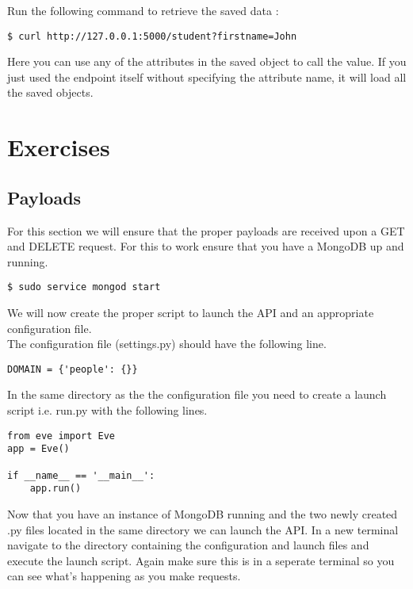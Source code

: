 \documentclass{article}
\begin{document}
Run the following command to retrieve the saved data :

\begin{verbatim}
$ curl http://127.0.0.1:5000/student?firstname=John
\end{verbatim}



\newline

Here you can use any of the attributes in the saved object to call the
value. If you just used the endpoint itself without specifying the
attribute name, it will load all the saved objects.

\section{Exercises}
\subsection{Payloads}
For this section we will ensure that the proper payloads are received
upon a GET and DELETE request. For this to work ensure that you have a
MongoDB up and running.
\begin{verbatim}
$ sudo service mongod start
\end{verbatim}

We will now create the proper script to launch the API and an
appropriate configuration file. \\ The configuration file
(settings.py) should have the following line.
\begin{verbatim}
DOMAIN = {'people': {}}
\end{verbatim}

In the same directory as the the configuration file you need to create
a launch script i.e. run.py with the following lines.

\begin{verbatim}
from eve import Eve
app = Eve()

if __name__ == '__main__':
    app.run()
\end{verbatim}

Now that you have an instance of MongoDB running and the two newly
created .py files located in the same directory we can launch the
API. In a new terminal navigate to the directory containing the
configuration and launch files and execute the launch script. Again
make sure this is in a seperate terminal so you can see what's
happening as you make requests.
\end{document}

